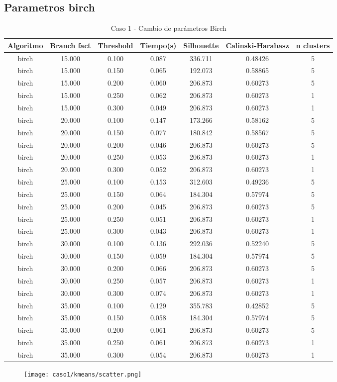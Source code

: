 \subsection{Parametros birch}


\begin{table}[H]
\centering
\caption{Caso 1 - Cambio de parámetros Birch}
\label{tab:c1_birch}
\begin{tabular}{ccccccc}
\toprule
Algoritmo & Branch fact & Threshold & Tiempo(s) & Silhouette & Calinski-Harabasz & n clusters \\
\midrule
birch & 15.000 & 0.100 & 0.087 & 336.711 & 0.48426 & 5 \\
birch & 15.000 & 0.150 & 0.065 & 192.073 & 0.58865 & 5 \\
birch & 15.000 & 0.200 & 0.060 & 206.873 & 0.60273 & 5 \\
birch & 15.000 & 0.250 & 0.062 & 206.873 & 0.60273 & 1 \\
birch & 15.000 & 0.300 & 0.049 & 206.873 & 0.60273 & 1 \\
birch & 20.000 & 0.100 & 0.147 & 173.266 & 0.58162 & 5 \\
birch & 20.000 & 0.150 & 0.077 & 180.842 & 0.58567 & 5 \\
birch & 20.000 & 0.200 & 0.046 & 206.873 & 0.60273 & 5 \\
birch & 20.000 & 0.250 & 0.053 & 206.873 & 0.60273 & 1 \\
birch & 20.000 & 0.300 & 0.052 & 206.873 & 0.60273 & 1 \\
birch & 25.000 & 0.100 & 0.153 & 312.603 & 0.49236 & 5 \\
birch & 25.000 & 0.150 & 0.064 & 184.304 & 0.57974 & 5 \\
birch & 25.000 & 0.200 & 0.045 & 206.873 & 0.60273 & 5 \\
birch & 25.000 & 0.250 & 0.051 & 206.873 & 0.60273 & 1 \\
birch & 25.000 & 0.300 & 0.043 & 206.873 & 0.60273 & 1 \\
birch & 30.000 & 0.100 & 0.136 & 292.036 & 0.52240 & 5 \\
birch & 30.000 & 0.150 & 0.059 & 184.304 & 0.57974 & 5 \\
birch & 30.000 & 0.200 & 0.066 & 206.873 & 0.60273 & 5 \\
birch & 30.000 & 0.250 & 0.057 & 206.873 & 0.60273 & 1 \\
birch & 30.000 & 0.300 & 0.074 & 206.873 & 0.60273 & 1 \\
birch & 35.000 & 0.100 & 0.129 & 355.783 & 0.42852 & 5 \\
birch & 35.000 & 0.150 & 0.058 & 184.304 & 0.57974 & 5 \\
birch & 35.000 & 0.200 & 0.061 & 206.873 & 0.60273 & 5 \\
birch & 35.000 & 0.250 & 0.061 & 206.873 & 0.60273 & 1 \\
birch & 35.000 & 0.300 & 0.054 & 206.873 & 0.60273 & 1 \\
\bottomrule
\end{tabular}
\end{table}

\begin{figure}
\texttt{[image: caso1/kmeans/scatter.png]}
\end{figure}